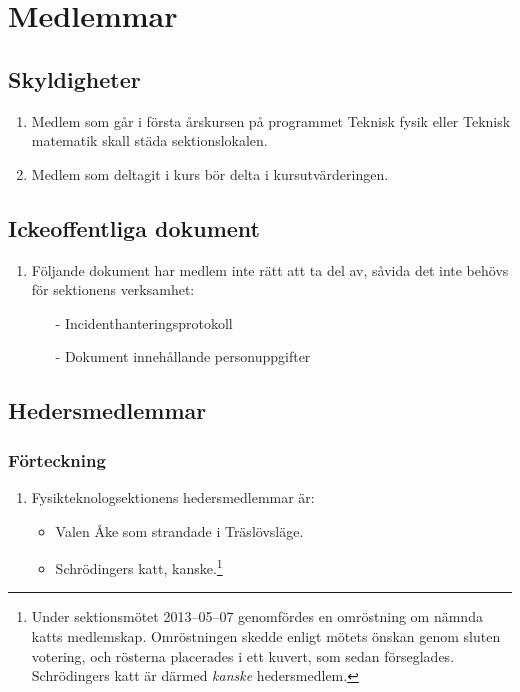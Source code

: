 \documentclass[11pt,a4paper]{article}
\begin{document}
\section{Medlemmar}

\subsection{Skyldigheter}
\begin{enumerate}[\thesubsection .1]
\item Medlem som går i första årskursen på programmet Teknisk fysik
     eller Teknisk matematik skall städa sektionslokalen.
 

   \item Medlem som deltagit i kurs bör delta i kursutvärderingen.
\end{enumerate}

\subsection{Ickeoffentliga dokument}

\begin{enumerate}[\thesubsection .1]

  \item Följande dokument har medlem inte rätt att ta del av, såvida det inte behövs för sektionens verksamhet:
  	\begin{itemize}
  		\item[-] Incidenthanteringsprotokoll
	 	\item[-] Dokument innehållande personuppgifter
  	\end{itemize}

\end{enumerate}

\subsection{Hedersmedlemmar}

\subsubsection{Förteckning}

\begin{enumerate}[\thesubsection .1]

  \item Fysikteknologsektionens hedersmedlemmar är:
    \begin{itemize}
      \item Valen Åke som strandade i Träslövsläge.
      \item Schrödingers katt, kanske.\footnote{Under sektionsmötet 2013--05--07 genomfördes en omröstning om nämnda katts medlemskap. Omröstningen skedde enligt mötets önskan genom sluten votering, och rösterna placerades i ett kuvert, som sedan förseglades. Schrödingers katt är därmed \textit{kanske} hedersmedlem.}
    \end{itemize}

\end{enumerate}
\end{document}
